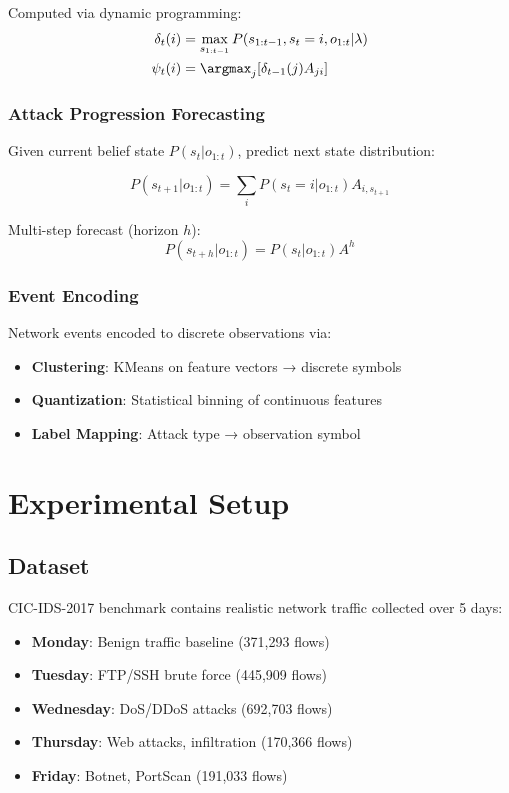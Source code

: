 \documentclass[conference]{IEEEtran}
\begin{document}
Computed via dynamic programming:
\begin{align}
\delta_t(i) &= \max_{s_{1:t-1}} P(s_{1:t-1}, s_t=i, o_{1:t} | \lambda) \\
\psi_t(i) &= \argmax_j [\delta_{t-1}(j) A_{ji}]
\end{align}

\subsubsection{Attack Progression Forecasting}
Given current belief state $P(s_t | o_{1:t})$, predict next state distribution:

\begin{equation}
P(s_{t+1} | o_{1:t}) = \sum_i P(s_t=i | o_{1:t}) A_{i,s_{t+1}}
\end{equation}

Multi-step forecast (horizon $h$):
\begin{equation}
P(s_{t+h} | o_{1:t}) = P(s_t | o_{1:t}) A^h
\end{equation}

\subsubsection{Event Encoding}
Network events encoded to discrete observations via:
\begin{itemize}
    \item \textbf{Clustering}: KMeans on feature vectors → discrete symbols
    \item \textbf{Quantization}: Statistical binning of continuous features
    \item \textbf{Label Mapping}: Attack type → observation symbol
\end{itemize}

\section{Experimental Setup}

\subsection{Dataset}
CIC-IDS-2017 benchmark contains realistic network traffic collected over 5 days:
\begin{itemize}
    \item \textbf{Monday}: Benign traffic baseline (371,293 flows)
    \item \textbf{Tuesday}: FTP/SSH brute force (445,909 flows)
    \item \textbf{Wednesday}: DoS/DDoS attacks (692,703 flows)
    \item \textbf{Thursday}: Web attacks, infiltration (170,366 flows)
    \item \textbf{Friday}: Botnet, PortScan (191,033 flows)
\end{itemize}
\end{document}
